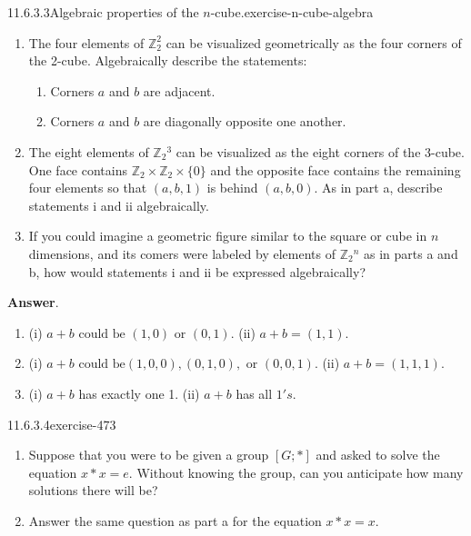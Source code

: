 \documentclass[twoside,10pt,]{book}
\numberwithin{equation}{section}
\begin{document}
\begin{divisionsolution}{11.6.3.3}{Algebraic properties of the \(n\)-cube.}{exercise-n-cube-algebra}%
\hypertarget{p-4198}{}%
\leavevmode%
\begin{enumerate}[label=(\alph*)]
\item\hypertarget{li-1909}{}\hypertarget{p-4199}{}%
The four elements of \(\mathbb{Z}_2^2\) can be visualized geometrically as the four corners of the 2-cube.  Algebraically describe the statements:%
\begin{enumerate}[label=(\roman*)]
\item\hypertarget{li-1910}{}\hypertarget{p-4200}{}%
Corners \(a\) and \(b\) are adjacent.%
\item\hypertarget{li-1911}{}\hypertarget{p-4201}{}%
Corners \(a\) and \(b\) are diagonally opposite one another.%
\end{enumerate}
%
\item\hypertarget{li-1912}{}\hypertarget{p-4202}{}%
The eight elements of \(\mathbb{Z}_2{}^3\) can be visualized as the eight corners of the 3-cube. One face contains \(\mathbb{Z}_2 \times 
\mathbb{Z}_2\times \{0\}\) and the opposite face contains the remaining four elements so that \((a, b, 1)\) is behind \((a, b, 0)\). As in part a, describe statements i and ii algebraically.%
\item\hypertarget{li-1913}{}\hypertarget{p-4203}{}%
If you could imagine a geometric figure similar to the square or cube in \(n\) dimensions, and its comers were labeled by elements of \(\mathbb{Z}_2{}^n\) as in parts a and b, how would statements i and ii be expressed algebraically?%
\end{enumerate}
%
\par\smallskip%
\noindent\textbf{Answer}.\quad%
\hypertarget{p-4204}{}%
\leavevmode%
\begin{enumerate}[label=(\alph*)]
\item\hypertarget{li-1914}{}\hypertarget{p-4205}{}%
(i) \(a + b \textrm{ could  be }(1, 0) \textrm{ or } (0, 1)\). (ii)  \(a + b = (1, 1)\).%
\item\hypertarget{li-1915}{}\hypertarget{p-4206}{}%
(i) \(a + b \textrm{ could  be}(1, 0, 0), (0, 1, 0), \textrm{ or }(0, 0, 1)\). (ii) \(a + b = (1, 1, 1)\).%
\item\hypertarget{li-1916}{}\hypertarget{p-4207}{}%
(i) \(a + b\) has exactly one 1. (ii) \(a + b\) has all \(1's\).%
\end{enumerate}
%
\end{divisionsolution}%
\begin{divisionsolution}{11.6.3.4}{}{exercise-473}%
\hypertarget{p-4208}{}%
\leavevmode%
\begin{enumerate}[label=(\alph*)]
\item\hypertarget{li-1917}{}\hypertarget{p-4209}{}%
Suppose that you were to be given a group \([G; * ]\) and asked to solve the equation \(x * x = e\). Without knowing the group, can you anticipate how many solutions there will be?%
\item\hypertarget{li-1918}{}\hypertarget{p-4210}{}%
Answer the same question as part a for the equation \(x * x = x\).%
\end{enumerate}
%
\end{divisionsolution}%
\end{document}
